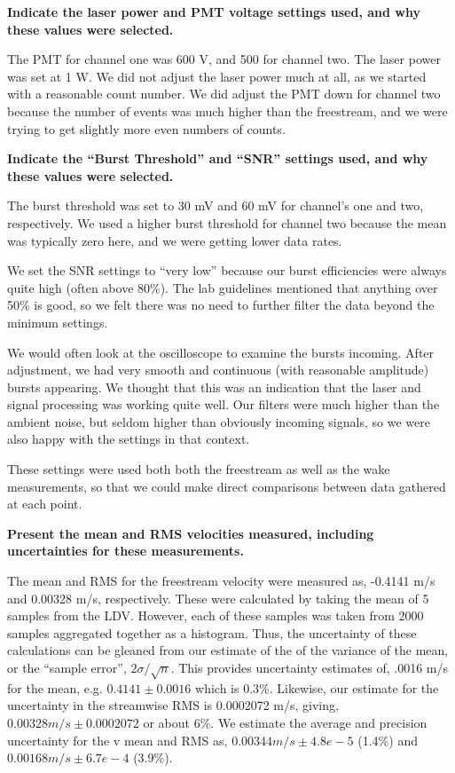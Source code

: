 \documentclass{article}
\begin{document}
\textbf{Indicate the laser power and PMT voltage settings used, and why
these values were selected.} 

The PMT for channel one was 600 V, and 500 for channel two. The laser
power was set at 1 W. We did not adjust the laser power much at all, as
we started with a reasonable count number. We did adjust the PMT down
for channel two because the number of events was much higher than the
freestream, and we were trying to get slightly more even numbers of
counts. 

\textbf{Indicate the ``Burst Threshold'' and ``SNR'' settings used, and why
these values were selected.} 


The burst threshold was set to 30 mV and 60 mV for channel's one and
two, respectively. We used a higher burst threshold for channel two
because the mean was typically zero here, and we were getting lower data
rates.

We set the SNR settings to ``very low'' because our burst efficiencies
were always quite high (often above 80\%). The lab guidelines mentioned
that anything over 50\% is good, so we felt there was no need to further
filter the data beyond the minimum settings. 

We would often look at the oscilloscope to examine the bursts incoming. 
After adjustment, we had very smooth and continuous (with reasonable
amplitude) bursts appearing. We thought that this was an indication that
the laser and signal processing was working quite well. Our filters were
much higher than the ambient noise, but seldom higher than obviously
incoming signals, so we were also happy with the settings in that
context. 

These settings were used both both the freestream as well as the wake
measurements, so that we could make direct comparisons between data
gathered at each point. 

%
%
%

\textbf{Present the mean and RMS velocities measured, including
uncertainties for these measurements.} 

The mean and RMS for the freestream velocity were measured as, 
-0.4141 m/s and 0.00328 m/s, respectively. These were calculated by
taking the mean of 5 samples from the LDV. However, each of these
samples was taken from 2000 samples aggregated together as a
histogram. Thus, the uncertainty of these calculations
can be gleaned from our estimate of the of the variance of the mean, or
the ``sample error'', $2\sigma/\sqrt{n}$. This provides uncertainty
estimates of, .0016 m/s for the mean, e.g. $0.4141 \pm
0.0016$ which is 0.3\%. Likewise, our estimate for the uncertainty in the
streamwise RMS is 0.0002072 m/s, giving, $0.00328 m/s \pm 0.0002072$ or
about 6\%. We estimate the average and precision uncertainty for the v
mean and RMS as, $0.00344 m/s \pm 4.8e-5$ (1.4\%) and $0.00168 m/s \pm
6.7e-4$ (3.9\%). 
\end{document}
